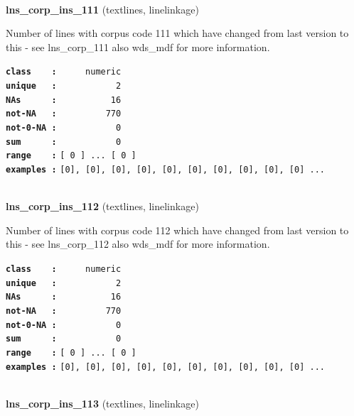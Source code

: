\documentclass[]{article}
\begin{document}
~

\textbf{lns\_corp\_ins\_111} (textlines, linelinkage)

Number of lines with corpus code 111 which have changed from last
version to this - see lns\_corp\_111 also wds\_mdf for more information.

\textbf{\texttt{class\ \ \ \ :}} \texttt{~~~~~numeric}\\
\textbf{\texttt{unique\ \ \ :}} \texttt{~~~~~~~~~~~2}\\
\textbf{\texttt{NAs\ \ \ \ \ \ :}} \texttt{~~~~~~~~~~16}\\
\textbf{\texttt{not-NA\ \ \ :}} \texttt{~~~~~~~~~770}\\
\textbf{\texttt{not-0-NA\ :}} \texttt{~~~~~~~~~~~0}\\
\textbf{\texttt{sum\ \ \ \ \ \ :}} \texttt{~~~~~~~~~~~0}\\
\textbf{\texttt{range\ \ \ \ :}}
\texttt{{[}\ 0\ {]}\ ...\ {[}\ 0\ {]}}\\
\textbf{\texttt{examples\ :}}
\texttt{{[}0{]},\ {[}0{]},\ {[}0{]},\ {[}0{]},\ {[}0{]},\ {[}0{]},\ {[}0{]},\ {[}0{]},\ {[}0{]},\ {[}0{]}\ ...}\\

~

\textbf{lns\_corp\_ins\_112} (textlines, linelinkage)

Number of lines with corpus code 112 which have changed from last
version to this - see lns\_corp\_112 also wds\_mdf for more information.

\textbf{\texttt{class\ \ \ \ :}} \texttt{~~~~~numeric}\\
\textbf{\texttt{unique\ \ \ :}} \texttt{~~~~~~~~~~~2}\\
\textbf{\texttt{NAs\ \ \ \ \ \ :}} \texttt{~~~~~~~~~~16}\\
\textbf{\texttt{not-NA\ \ \ :}} \texttt{~~~~~~~~~770}\\
\textbf{\texttt{not-0-NA\ :}} \texttt{~~~~~~~~~~~0}\\
\textbf{\texttt{sum\ \ \ \ \ \ :}} \texttt{~~~~~~~~~~~0}\\
\textbf{\texttt{range\ \ \ \ :}}
\texttt{{[}\ 0\ {]}\ ...\ {[}\ 0\ {]}}\\
\textbf{\texttt{examples\ :}}
\texttt{{[}0{]},\ {[}0{]},\ {[}0{]},\ {[}0{]},\ {[}0{]},\ {[}0{]},\ {[}0{]},\ {[}0{]},\ {[}0{]},\ {[}0{]}\ ...}\\

~

\textbf{lns\_corp\_ins\_113} (textlines, linelinkage)
\end{document}
